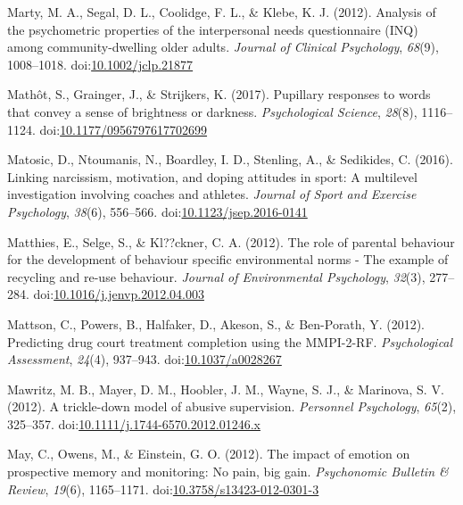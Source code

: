\documentclass[english,man]{apa6}
\theoremstyle{definition}
\theoremstyle{definition}
\theoremstyle{definition}
\theoremstyle{remark}
\begin{document}
\hypertarget{ref-Marty2012}{}
Marty, M. A., Segal, D. L., Coolidge, F. L., \& Klebe, K. J. (2012).
Analysis of the psychometric properties of the interpersonal needs
questionnaire (INQ) among community-dwelling older adults. \emph{Journal
of Clinical Psychology}, \emph{68}(9), 1008--1018.
doi:\href{https://doi.org/10.1002/jclp.21877}{10.1002/jclp.21877}

\hypertarget{ref-Mathot2017}{}
Mathôt, S., Grainger, J., \& Strijkers, K. (2017). Pupillary responses
to words that convey a sense of brightness or darkness.
\emph{Psychological Science}, \emph{28}(8), 1116--1124.
doi:\href{https://doi.org/10.1177/0956797617702699}{10.1177/0956797617702699}

\hypertarget{ref-Matosic2016}{}
Matosic, D., Ntoumanis, N., Boardley, I. D., Stenling, A., \& Sedikides,
C. (2016). Linking narcissism, motivation, and doping attitudes in
sport: A multilevel investigation involving coaches and athletes.
\emph{Journal of Sport and Exercise Psychology}, \emph{38}(6), 556--566.
doi:\href{https://doi.org/10.1123/jsep.2016-0141}{10.1123/jsep.2016-0141}

\hypertarget{ref-Matthies2012}{}
Matthies, E., Selge, S., \& Kl??ckner, C. A. (2012). The role of
parental behaviour for the development of behaviour specific
environmental norms - The example of recycling and re-use behaviour.
\emph{Journal of Environmental Psychology}, \emph{32}(3), 277--284.
doi:\href{https://doi.org/10.1016/j.jenvp.2012.04.003}{10.1016/j.jenvp.2012.04.003}

\hypertarget{ref-Mattson2012}{}
Mattson, C., Powers, B., Halfaker, D., Akeson, S., \& Ben-Porath, Y.
(2012). Predicting drug court treatment completion using the MMPI-2-RF.
\emph{Psychological Assessment}, \emph{24}(4), 937--943.
doi:\href{https://doi.org/10.1037/a0028267}{10.1037/a0028267}

\hypertarget{ref-Mawritz2012}{}
Mawritz, M. B., Mayer, D. M., Hoobler, J. M., Wayne, S. J., \& Marinova,
S. V. (2012). A trickle-down model of abusive supervision.
\emph{Personnel Psychology}, \emph{65}(2), 325--357.
doi:\href{https://doi.org/10.1111/j.1744-6570.2012.01246.x}{10.1111/j.1744-6570.2012.01246.x}

\hypertarget{ref-May2012}{}
May, C., Owens, M., \& Einstein, G. O. (2012). The impact of emotion on
prospective memory and monitoring: No pain, big gain. \emph{Psychonomic
Bulletin \& Review}, \emph{19}(6), 1165--1171.
doi:\href{https://doi.org/10.3758/s13423-012-0301-3}{10.3758/s13423-012-0301-3}
\end{document}
